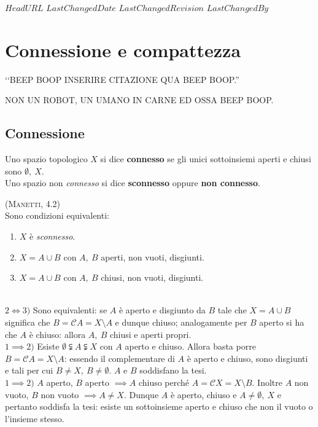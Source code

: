 \svnidlong
{$HeadURL$}
{$LastChangedDate$}
{$LastChangedRevision$}
{$LastChangedBy$}

\chapter{Connessione e compattezza}

\begin{introduction}
‘‘BEEP BOOP INSERIRE CITAZIONE QUA BEEP BOOP.''
\begin{flushright}
	\textsc{NON UN ROBOT,} UN UMANO IN CARNE ED OSSA BEEP BOOP.
\end{flushright}
\end{introduction}

\section{Connessione}
\begin{define}
Uno spazio topologico $X$ si dice \textbf{connesso} se gli unici sottoinsiemi aperti e chiusi sono $\emptyset,\ X$.\\
Uno spazio non \textit{connesso} si dice \textbf{sconnesso} oppure \textbf{non connesso}.
\end{define}
\begin{lemming}\label{sconnesso}\textsc{(Manetti, 4.2)}\\
	Sono condizioni equivalenti:
	\begin{enumerate}
		\item $X$ è \textit{sconnesso}.
		\item $X=A\cup B$ con $A,\ B$ aperti, non vuoti, disgiunti.
		\item $X=A\cup B$ con $A,\ B$ chiusi, non vuoti, disgiunti.
	\end{enumerate}
\end{lemming}
\begin{demonstration}~{}\\
$2\iff3)$ Sono equivalenti: se $A$ è aperto e disgiunto da $B$ tale che $X=A\cup B$ significa che $B=\mathcal{C}A=X\setminus A$ e dunque chiuso; analogamente per $B$ aperto si ha che $A$ è chiuso: allora $A,\ B$ chiusi e aperti propri.\\
$1\implies2)$ Esiste $\emptyset\subsetneqq A \subsetneqq X$ con $A$ aperto e chiuso. Allora basta porre $B=\mathcal{C}A=X\setminus A$: essendo il complementare di $A$ è aperto e chiuso, sono disgiunti e tali per cui $B\neq X,\ B\neq \emptyset$. $A$ e $B$ soddisfano la tesi.\\
$1\implies2)$ $A$ aperto, $B$ aperto $\implies A$ chiuso perché $A=\mathcal{C}X=X\setminus B$. Inoltre $A$ non vuoto, $B$ non vuoto $\implies A\neq X$. Dunque $A$ è aperto, chiuso e $A\neq \emptyset,\ X$ e pertanto soddisfa la tesi: esiste un sottoinsieme aperto e chiuso che non il vuoto o l'insieme stesso.
\end{demonstration}
